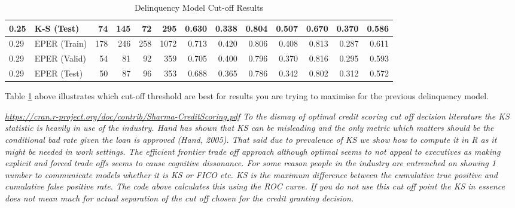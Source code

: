 \begin{table}[H]
{\begin{tabular}{l|l|r|r|r|r|r|r|r|r|r|r|r}
			0.25             & K-S (Test)  & 74          & 145         & 72          & 295         & 0.630             & 0.338              & 0.804        & 0.507           & 0.670                & 0.370  & 0.586     \\ \hline
			0.29             & EPER (Train)          & 178         & 246         & 258         & 1072        & 0.713             & 0.420              & 0.806        & 0.408           & 0.813                & 0.287  & 0.611     \\
			0.29             & EPER (Valid)          & 54          & 81          & 92          & 359         & 0.705             & 0.400              & 0.796        & 0.370           & 0.816                & 0.295    & 0.593   \\
			0.29             & EPER (Test)           & 50          & 87          & 96          & 353         & 0.688             & 0.365              & 0.786        & 0.342           & 0.802                & 0.312  & 0.572    \\ \hline
		\end{tabular}
	}
	\caption{Delinquency Model Cut-off Results }
	\label{table:DelinquencyModelCutoff}
\end{table}

Table \ref{table:DelinquencyModelCutoff} above illustrates which cut-off threshold are best for results you are trying to maximise for the previous delinquency model.

\textit{
	\url{https://cran.r-project.org/doc/contrib/Sharma-CreditScoring.pdf}
	To the dismay of optimal credit scoring cut off decision literature the KS statistic is
	heavily in use of the industry. Hand has shown that KS can be misleading and the only
	metric which matters should be the conditional bad rate given the loan is approved
	(Hand, 2005).
	That said due to prevalence of KS we show how to compute it in R as it might be needed
	in work settings. The efficient frontier trade off approach although optimal seems to not appeal to executives as making explicit and forced trade offs seems to cause cognitive
	dissonance. For some reason people in the industry are entrenched on showing 1 number
	to communicate models whether it is KS or FICO etc.
	KS is the maximum difference between the cumulative true positive and cumulative false
	positive rate. The code above calculates this using the ROC curve.
	If you do not use this cut off point the KS in essence does not mean much for actual
	separation of the cut off chosen for the credit granting decision.
}

